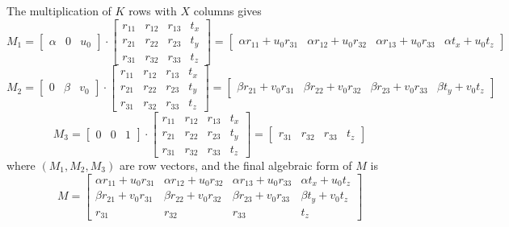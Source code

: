 \documentclass[12pt]{report}
\begin{document}
\begin{enumerate}
\begin{enumerate}
    The multiplication of $K$ rows with $X$ columns gives 
    $$
    M_1 = 
    \begin{bmatrix}
    \alpha & 0 & u_0
    \end{bmatrix}
    \cdot
    \begin{bmatrix}
    r_{11} & r_{12} & r_{13} & t_x \\
    r_{21} & r_{22} & r_{23} & t_y \\
    r_{31} & r_{32} & r_{33} & t_z
    \end{bmatrix}
    =
    \begin{bmatrix}
    \alpha r_{11} + u_0 r_{31} & \alpha r_{12} + u_0 r_{32} & \alpha r_{13} + u_0 r_{33} & \alpha t_x + u_0 t_z
    \end{bmatrix}
    $$
    $$
    M_2 = 
    \begin{bmatrix}
    0 & \beta & v_0
    \end{bmatrix}
    \cdot
    \begin{bmatrix}
    r_{11} & r_{12} & r_{13} & t_x \\
    r_{21} & r_{22} & r_{23} & t_y \\
    r_{31} & r_{32} & r_{33} & t_z
    \end{bmatrix}
    =
    \begin{bmatrix}
    \beta r_{21} + v_0 r_{31} & \beta r_{22} + v_0 r_{32} & \beta r_{23} + v_0 r_{33} & \beta t_y + v_0 t_z
    \end{bmatrix}
    $$
    $$
    M_3 = 
    \begin{bmatrix}
    0 & 0 & 1
    \end{bmatrix}
    \cdot
    \begin{bmatrix}
    r_{11} & r_{12} & r_{13} & t_x \\
    r_{21} & r_{22} & r_{23} & t_y \\
    r_{31} & r_{32} & r_{33} & t_z
    \end{bmatrix}
    =
    \begin{bmatrix}
    r_{31} & r_{32} & r_{33} & t_z
    \end{bmatrix}
    $$
    where $(M_1,M_2,M_3)$ are row vectors, and the final algebraic form of $M$ is 
    $$
    M = \begin{bmatrix}
    \alpha r_{11} + u_0 r_{31} & \alpha r_{12} + u_0 r_{32} & \alpha r_{13} + u_0 r_{33} & \alpha t_x + u_0 t_z \\
    \beta r_{21} + v_0 r_{31} & \beta r_{22} + v_0 r_{32} & \beta r_{23} + v_0 r_{33} & \beta t_y + v_0 t_z \\
    r_{31} & r_{32} & r_{33} & t_z
    \end{bmatrix}
    $$



\end{enumerate}
\end{enumerate}
\end{document}
